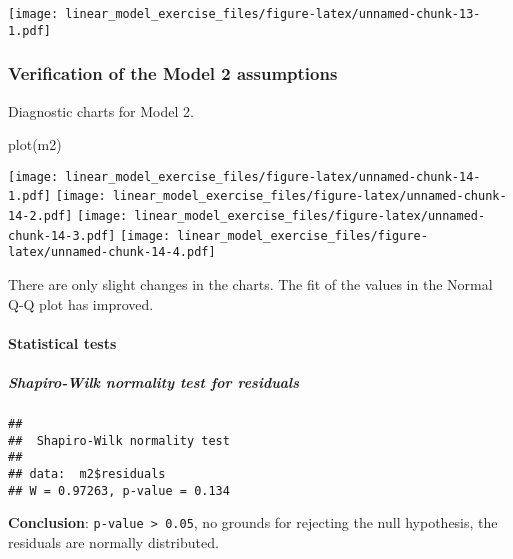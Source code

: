 \documentclass[
]{article}
\newenvironment{Shaded}{\begin{snugshade}}{\end{snugshade}}
\newcommand{\FunctionTok}[1]{\textcolor[rgb]{0.00,0.00,0.00}{#1}}
\newcommand{\NormalTok}[1]{#1}
\newcommand{\SpecialCharTok}[1]{\textcolor[rgb]{0.00,0.00,0.00}{#1}}
\begin{document}
\texttt{[image: linear\_model\_exercise\_files/figure-latex/unnamed-chunk-13-1.pdf]}

\hypertarget{verification-of-the-model-2-assumptions}{%
\subsubsection{Verification of the Model 2
assumptions}\label{verification-of-the-model-2-assumptions}}

Diagnostic charts for Model 2.

\begin{Shaded}
\begin{Highlighting}[]
\FunctionTok{plot}\NormalTok{(m2)}
\end{Highlighting}
\end{Shaded}

\texttt{[image: linear\_model\_exercise\_files/figure-latex/unnamed-chunk-14-1.pdf]}
\texttt{[image: linear\_model\_exercise\_files/figure-latex/unnamed-chunk-14-2.pdf]}
\texttt{[image: linear\_model\_exercise\_files/figure-latex/unnamed-chunk-14-3.pdf]}
\texttt{[image: linear\_model\_exercise\_files/figure-latex/unnamed-chunk-14-4.pdf]}

There are only slight changes in the charts. The fit of the values in
the Normal Q-Q plot has improved.

\hypertarget{statistical-tests-1}{%
\paragraph{Statistical tests}\label{statistical-tests-1}}

\hypertarget{shapiro-wilk-normality-test-for-residuals-1}{%
\subparagraph{Shapiro-Wilk normality test for
residuals}\label{shapiro-wilk-normality-test-for-residuals-1}}

\begin{Shaded}
\end{Shaded}

\begin{verbatim}
## 
##  Shapiro-Wilk normality test
## 
## data:  m2$residuals
## W = 0.97263, p-value = 0.134
\end{verbatim}

\textbf{Conclusion}: \texttt{p-value\ \textgreater{}\ 0.05}, no grounds
for rejecting the null hypothesis, the residuals are normally
distributed.
\end{document}
